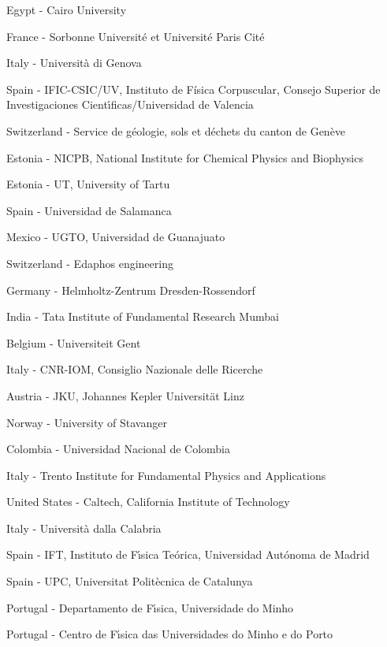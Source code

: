 \item[$^{315}$] Egypt - Cairo University
\item[$^{316}$] France - Sorbonne Universit{\'e} et Universit{\'e} Paris Cit\'e
\item[$^{317}$] Italy - Universit{\`a} di Genova
\item[$^{318}$] Spain - IFIC-CSIC/UV, Instituto de F\'{i}sica Corpuscular, Consejo Superior de Investigaciones Cient{\'\i}ficas/Universidad de Valencia
\item[$^{319}$] Switzerland - Service de g{\'e}ologie, sols et d{\'e}chets du canton de Gen{\`e}ve
\item[$^{320}$] Estonia - NICPB, National Institute for Chemical Physics and Biophysics
\item[$^{321}$] Estonia - UT, University of Tartu
\item[$^{322}$] Spain - Universidad de Salamanca
\item[$^{323}$] Mexico - UGTO, Universidad de Guanajuato
\item[$^{324}$] Switzerland - Edaphos engineering
\item[$^{325}$] Germany - Helmholtz-Zentrum Dresden-Rossendorf
\item[$^{326}$] India - Tata Institute of Fundamental Research Mumbai
\item[$^{327}$] Belgium - Universiteit Gent
\item[$^{328}$] Italy - CNR-IOM, Consiglio Nazionale delle Ricerche
\item[$^{329}$] Austria - JKU, Johannes Kepler Universit{\"a}t Linz
\item[$^{330}$] Norway - University of Stavanger
\item[$^{331}$] Colombia - Universidad Nacional de Colombia
\item[$^{332}$] Italy - Trento Institute for Fundamental Physics and Applications
\item[$^{333}$] United States - Caltech, California Institute of Technology
\item[$^{334}$] Italy - Universit{\`a} dalla Calabria
\item[$^{335}$] Spain - IFT, Instituto de F{\'\i}sica Te{\'o}rica, Universidad Aut{\'o}noma de Madrid
\item[$^{336}$] Spain - UPC, Universitat Polit\`{e}cnica de Catalunya
\item[$^{337}$] Portugal - Departamento de F{\'\i}sica, Universidade do Minho
\item[$^{338}$] Portugal - Centro de F{\'\i}sica das Universidades do Minho e do Porto
